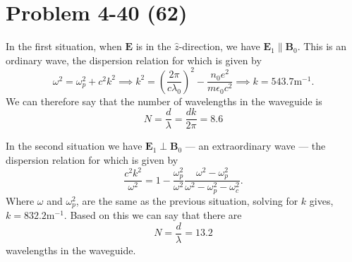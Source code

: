 \section*{Problem 4-40 (62)}
\label{sec:4-40}
In the first situation, when \(\bm{E} \) is in the \(\hat{z}\)-direction, we have \(\bm{E}_1\parallel\bm{B}_0 \). This is an ordinary wave, the dispersion relation for which is given by
\begin{equation*}
	\omega^2 = \omega^2_p + c^2k^2 \implies k^2 = \left(\dfrac{2\pi}{c\lambda_0} \right)^2 - \dfrac{n_0e^2}{m\epsilon_0c^2} \implies k = 543.7\text{m}^{-1}.
\end{equation*}
We can therefore say that the number of wavelengths in the waveguide is
\begin{equation*}
	N = \dfrac{d}{\lambda} = \dfrac{dk}{2\pi} = 8.6
\end{equation*}

In the second situation we have \(\bm{E}_1\perp\bm{B}_0 \) --- an extraordinary wave --- the dispersion relation for which is given by
\begin{equation*}
	\dfrac{c^2k^2}{\omega^2} = 1 - \dfrac{\omega^2_p}{\omega^2}\dfrac{\omega^2 - \omega^2_p}{\omega^2 - \omega^2_p - \omega^2_c}.
\end{equation*}
Where \(\omega\) and \(\omega_p^2 \), are the same as the previous situation, solving for \(k\) gives, \(k = 832.2\text{m}^{-1} \). Based on this we can say that there are
\begin{equation*}
	N =\dfrac{d}{\lambda} = 13.2
\end{equation*}
wavelengths in the waveguide.

